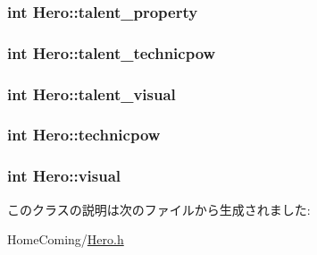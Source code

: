 \hypertarget{class_hero_a18363568d19a059d64d5864788a04a85}{
\subsubsection[{talent\-\_\-property}]{\setlength{\rightskip}{0pt plus 5cm}int {\bf Hero\-::talent\-\_\-property}}}\label{class_hero_a18363568d19a059d64d5864788a04a85}
\hypertarget{class_hero_ad70bb2fa210cd7b1d40f18a894a8b901}{
\subsubsection[{talent\-\_\-technicpow}]{\setlength{\rightskip}{0pt plus 5cm}int {\bf Hero\-::talent\-\_\-technicpow}}}\label{class_hero_ad70bb2fa210cd7b1d40f18a894a8b901}
\hypertarget{class_hero_a503facff977509d2d128b1f4fbadfc3d}{
\subsubsection[{talent\-\_\-visual}]{\setlength{\rightskip}{0pt plus 5cm}int {\bf Hero\-::talent\-\_\-visual}}}\label{class_hero_a503facff977509d2d128b1f4fbadfc3d}
\hypertarget{class_hero_ad4835e0318acceb88198a8a8b11e6a71}{
\subsubsection[{technicpow}]{\setlength{\rightskip}{0pt plus 5cm}int {\bf Hero\-::technicpow}}}\label{class_hero_ad4835e0318acceb88198a8a8b11e6a71}
\hypertarget{class_hero_a5f9ad5cdca801f5a50a061f4922efd7d}{
\subsubsection[{visual}]{\setlength{\rightskip}{0pt plus 5cm}int {\bf Hero\-::visual}}}\label{class_hero_a5f9ad5cdca801f5a50a061f4922efd7d}


このクラスの説明は次のファイルから生成されました\-:\begin{DoxyCompactItemize}
\item 
Home\-Coming/\hyperlink{_hero_8h}{Hero.\-h}\end{DoxyCompactItemize}
